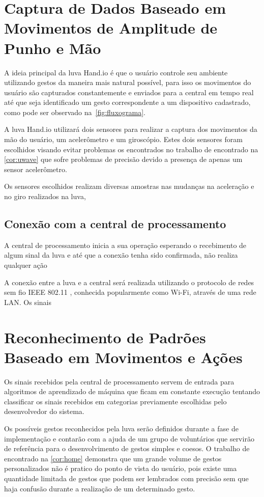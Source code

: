 \section{Captura de Dados Baseado em Movimentos de Amplitude de Punho e Mão}

A ideia principal da luva Hand.io é que o usuário controle seu ambiente utilizando gestos da maneira mais natural possível, para isso os movimentos do usuário são capturados constantemente e enviados para a central em tempo real até que seja identificado um gesto correspondente a um dispositivo cadastrado, como pode ser observado na~\autoref{fig:fluxograma}.

A luva Hand.io utilizará dois sensores para realizar a captura dos movimentos da mão do usuário, um acelerômetro e um giroscópio. Estes dois sensores foram escolhidos visando evitar problemas os encontrados no trabalho de  encontrado na \autoref{cor:uwave} que sofre problemas de precisão devido a presença de apenas um sensor acelerômetro.

Os sensores escolhidos realizam diversas amostras nas mudanças na aceleração e no giro realizados na luva, 



\subsection{Conexão com a central de processamento}

A central de processamento inicia a sua operação esperando o recebimento de algum sinal da luva e até que a conexão tenha sido confirmada, não realiza qualquer ação

A conexão entre a luva e a central será realizada utilizando o protocolo de redes sem fio IEEE 802.11  \cite{802.11:1997}, conhecida popularmente como Wi-Fi, através de uma rede LAN. Os sinais 

\section{Reconhecimento de Padrões Baseado em Movimentos e Ações}

Os sinais recebidos pela central de processamento servem de entrada para algoritmos de aprendizado de máquina que ficam em constante execução tentando classificar os sinais recebidos em categorias previamente escolhidas pelo desenvolvedor do sistema. 

Os possíveis gestos reconhecidos pela luva serão definidos durante a fase de implementação e contarão com a ajuda de um grupo de voluntários que servirão de referência para o desenvolvimento de gestos simples e coesos. O trabalho de  encontrado na \autoref{cor:home} demonstra que um grande volume de gestos personalizados não é pratico do ponto de vista do usuário, pois existe uma quantidade limitada de gestos que podem ser lembrados com precisão sem que haja confusão durante a realização de um determinado gesto.

